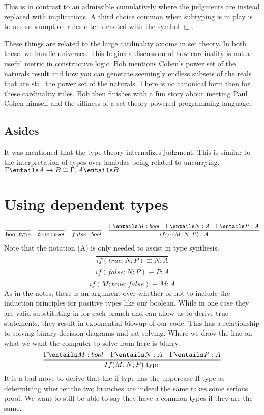 \documentclass[11pt]{article}
\begin{document}
This is in contrast to an admissible cumulatively where the judgments are instead replaced with implications. A third choice common when subtyping is in play is to use subsumption rules often denoted with the symbol $\sqsubset$.

These things are related to the large cardinality axioms in set theory. In both these, we handle universes. This begins a discussion of how cardinality is not a useful metric in constructive logic. Bob mentions Cohen's power set of the naturals result and how you can generate seemingly endless subsets of the reals that are still the power set of the naturals. There is no canonical form then for these cardinality rules. Bob then finishes with a fun story about meeting Paul Cohen himself and the silliness of a set theory powered programming language.

\subsection*{Asides}
It was mentioned that the type theory internalizes judgment. This is similar to the interpretation of types over lambdas being related to uncurrying. $\Gamma \entails A \rightarrow B \cong \Gamma, A \entails B$
\section*{Using dependent types}
$$\frac{}{\text{bool type}} \quad \frac{}{true : bool} \quad \frac{}{false : bool} \quad \frac{\Gamma \entails M : bool \quad \Gamma \entails N : A \quad \Gamma \entails P : A}{if_{(A)} (M; N; P) : A}$$
Note that the notation (A) is only needed to assist in type synthesis.
$$\frac{}{if(true; N; P) \equiv N : A}$$
$$\frac{}{if(false; N; P)  \equiv P : A}$$
$$\frac{}{if(M; true; false) \equiv M : A}$$
As in the notes, there is an argument over whether or not to include the induction principles for positive types like our boolean. While in one case they are valid substituting in for each branch and can allow us to derive true statements, they result in exponential blowup of our code. This has a relationship to solving binary decision diagrams and sat solving. Where we draw the line on what we want the computer to solve from here is blurry.
$$\frac{\Gamma \entails M : bool \quad \Gamma \entails N : A \quad \Gamma \entails P : A}{If(M; N; P)\text{ type}}$$
It is a bad move to derive that the if type has the uppercase If type as determining whether the two branches are indeed the same takes some serious proof. We want to still be able to say they have a common types if they are the same.
\end{document}
